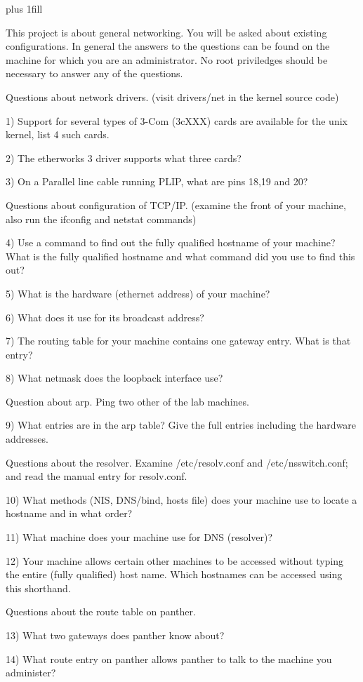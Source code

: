 
\rightskip=0pt plus 1fill

\parindent 0pt

This project is about general networking.
You will be asked about existing configurations. 
In general the answers to the questions can be found on the machine for
which you are an administrator.
No root priviledges should be necessary to answer any of the questions.

Questions about network drivers.
(visit {\ltt{}drivers/net} in the kernel source code)

1) Support for several types of 3-Com (3cXXX) cards are available
for the unix kernel, list 4 such cards.

2) The etherworks 3 driver supports what three cards?

3) On a Parallel line cable running PLIP, what are pins 18,19 and 20?

Questions about configuration of TCP/IP.
(examine the front of your machine, also run the ifconfig and netstat commands)

4) Use a command to find out the fully qualified hostname of your machine?
What is the fully qualified hostname and what command did you use to find this out?

5) What is the hardware (ethernet address) of your machine?

6) What does it use for its broadcast address?

7) The routing table for your machine contains one gateway entry.
What is that entry?

8) What netmask does the loopback interface use?

Question about arp.  Ping two other of the lab machines. 

9) What entries are in the arp table?
Give the full entries including the hardware addresses.

Questions about the resolver. 
Examine {\ltt{}/etc/resolv.conf} and {\ltt{}/etc/nsswitch.conf};
and read the manual entry for {\ltt{}resolv.conf}.

10) What methods (NIS, DNS/bind, hosts file) does your machine use
to locate a hostname and in what order?

11) What machine does your machine use for DNS (resolver)?

12) Your machine allows certain other machines to be accessed without
typing the entire (fully qualified) host name. Which hostnames can
be accessed using this shorthand.

Questions about the route table on {\ltt{}panther}.

13) What two gateways does {\ltt{}panther} know about?

14) What route entry on {\ltt{}panther} allows {\ltt{}panther}
to talk to the machine you administer?
\bye
